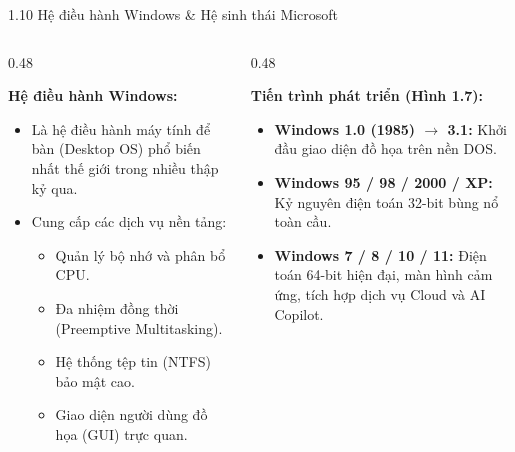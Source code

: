 \documentclass[aspectratio=169, 10pt]{beamer}
\begin{document}
\begin{frame}{1.10 Hệ điều hành Windows \& Hệ sinh thái Microsoft}
  \begin{columns}[T]
    \begin{column}{0.48\textwidth}
      \begin{block}{\textbf{Hệ điều hành Windows:}}
        \begin{itemize}
          \item Là hệ điều hành máy tính để bàn (Desktop OS) phổ biến nhất thế giới trong nhiều thập kỷ qua.
          \item Cung cấp các dịch vụ nền tảng:
          \begin{itemize}
            \item Quản lý bộ nhớ và phân bổ CPU.
            \item Đa nhiệm đồng thời (Preemptive Multitasking).
            \item Hệ thống tệp tin (NTFS) bảo mật cao.
            \item Giao diện người dùng đồ họa (GUI) trực quan.
          \end{itemize}
        \end{itemize}
      \end{block}
    \end{column}
    \begin{column}{0.48\textwidth}
      \begin{block}{\textbf{Tiến trình phát triển (Hình 1.7):}}
        \begin{itemize}
          \item \textbf{Windows 1.0 (1985) $\to$ 3.1:} Khởi đầu giao diện đồ họa trên nền DOS.
          \item \textbf{Windows 95 / 98 / 2000 / XP:} Kỷ nguyên điện toán 32-bit bùng nổ toàn cầu.
          \item \textbf{Windows 7 / 8 / 10 / 11:} Điện toán 64-bit hiện đại, màn hình cảm ứng, tích hợp dịch vụ Cloud và AI Copilot.
        \end{itemize}
      \end{block}
    \end{column}
  \end{columns}
\end{frame}
\end{document}

